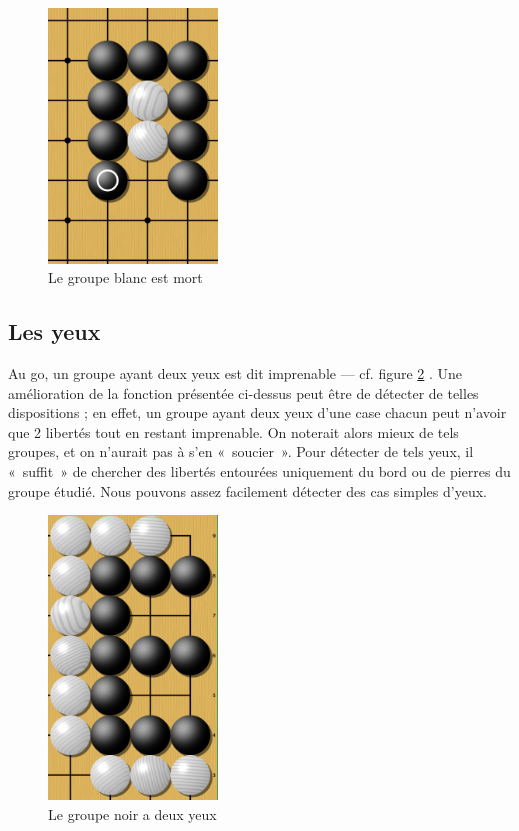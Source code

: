 \documentclass[11pt,a4paper,titlepage,french]{article}
\begin{document}
			\begin{figure}[hbt]
			\label{groupemort}
			\begin{center}
			\includegraphics[width=0.4\textwidth]{groupemort.png}
			\end{center}
			\caption{Le groupe blanc est mort}

			\end{figure}

		\subsection{Les yeux}
			Au go, un groupe ayant deux yeux est dit imprenable --- cf. figure \ref{deuxyeux} . Une amélioration de la fonction présentée ci-dessus peut être de détecter de telles dispositions ; en effet, un groupe ayant deux yeux d'une case chacun peut n'avoir que 2 libertés tout en restant imprenable. On noterait alors mieux de tels groupes, et on n'aurait pas à s'en «~soucier~». Pour détecter de tels yeux, il «~suffit~» de chercher des libertés entourées uniquement du bord ou de pierres du groupe étudié. Nous pouvons assez facilement détecter des cas simples d'yeux.

			\begin{figure}[hbt]
			\label{deuxyeux}
			\begin{center}
			\includegraphics[width=0.4\textwidth]{deuxyeux.png}
			\end{center}
			\caption{Le groupe noir a deux yeux}
			\end{figure}
\end{document}
